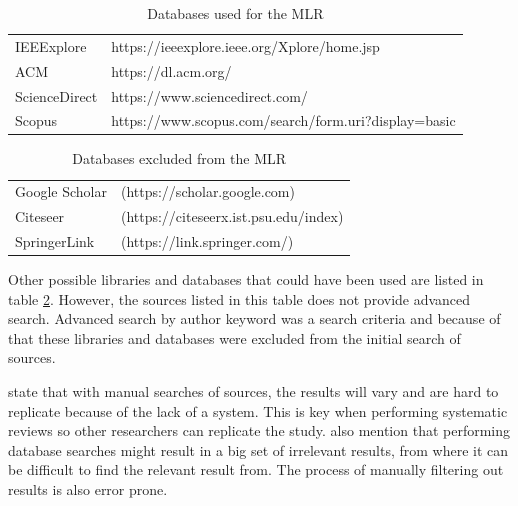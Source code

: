 \documentclass[english, 12pt, a4paper, sci, utf8, a-1b, online]{aaltothesis}
\begin{document}
\begin{table}
  \centering
  \begin{tabular}{ l l }
    \hline
    IEEExplore    & https://ieeexplore.ieee.org/Xplore/home.jsp          \\
    ACM           & https://dl.acm.org/                                  \\
    ScienceDirect & https://www.sciencedirect.com/                       \\
    Scopus        & https://www.scopus.com/search/form.uri?display=basic \\
    \hline
  \end{tabular}
  \caption{Databases used for the MLR}
  \label{table:included-databases}
\end{table}

\begin{table}
  \centering
  \begin{tabular}{ l l }
    \hline
    Google Scholar & (https://scholar.google.com)          \\
    Citeseer       & (https://citeseerx.ist.psu.edu/index) \\
    SpringerLink   & (https://link.springer.com/)          \\
    \hline
  \end{tabular}
  \caption{Databases excluded from the MLR}
  \label{table:excluded-databases}
\end{table}

Other possible libraries and databases that could have been used are listed in table \ref{table:excluded-databases}. However, the sources listed in this table does not provide advanced search. Advanced search by author keyword was a search criteria and because of that these libraries and databases were excluded from the initial search of sources.

\textcite{guidelines-for-snowballing} state that with manual searches of sources, the results will vary and are hard to replicate because of the lack of a system. This is key when performing systematic reviews so other researchers can replicate the study. \textcite{guidelines-for-snowballing} also mention that performing database searches might result in a big set of irrelevant results, from where it can be difficult to find the relevant result from. The process of manually filtering out results is also error prone.
\end{document}
